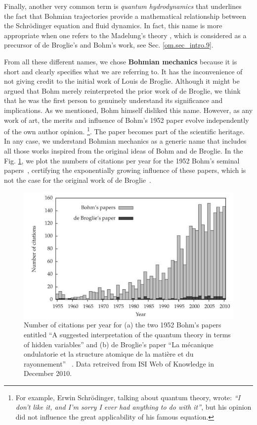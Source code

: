 \documentclass[onecolumn,nofootinbib, secnumarabic, amsmath, nobibnotes,11pt,aps,pra]{revtex4-1}
\newcommand{\fref}[1]{Fig. \ref{#1}}
\newcommand{\sref}[1]{Sec. \ref{#1}}
\begin{document}
\newpage

Finally, another very common term is \emph{quantum hydrodynamics} \cite{om.wyatt2005} that underlines the fact that Bohmian trajectories provide a mathematical relationship between the Schr\"odinger equation and fluid dynamics. In fact, this name is more appropriate when one refers to the Madelung's theory \cite{om.Madelung}, which is considered as a precursor of de Broglie's and Bohm's work, see \sref{om.sec_intro.9}.

From all these different names, we chose \textbf{Bohmian mechanics} because it is short and clearly specifies what we are referring to. It has the inconvenience of not giving credit to the initial work of Louis de Broglie.
Although it might be argued that Bohm merely reinterpreted the prior work of de Broglie, we think that he was the first person to genuinely understand its significance and implications. As we mentioned, Bohm himself disliked this name. However, as any work of art, the merits and influence of Bohm's 1952 paper evolve independently of the own author opinion. \footnote{For example, Erwin Schr\"odinger, talking about quantum theory, wrote: \emph{``I don't like it, and I'm sorry I ever had anything to do with it''}, but his opinion did not influence the great applicability of his famous equation.}. The paper becomes part of the scientific heritage.
In any case, we understand Bohmian mechanics as a generic name that includes all those works inspired from the original ideas of Bohm and de Broglie. In the \fref{om_Datos_Bohm}, we plot the numbers of citations per year for the 1952 Bohm's seminal papers~\cite{om.bohm1952a,om.bohm1952b}, certifying the exponentially growing influence of these papers, which is not the case for the original work of de Broglie~\cite{om.debroglie1927b}.

\begin{figure}
\centering
\includegraphics*[width=13cm]{F0_citations_opt.pdf}
\caption{Number of citations per year for (a) the two 1952 Bohm's papers entitled ``A suggested interpretation of the quantum theory in terms of hidden variables'' \cite{om.bohm1952a,om.bohm1952b} and (b) de Broglie's paper ``La m\'ecanique ondulatorie et la structure atomique de la mati\`ere et du rayonnement'' ~\cite{om.debroglie1927b}. Data retreived from ISI Web of Knowledge \cite{om.isiweb} in December 2010.}
\nonumber
\label{om_Datos_Bohm}
\end{figure}
\end{document}
